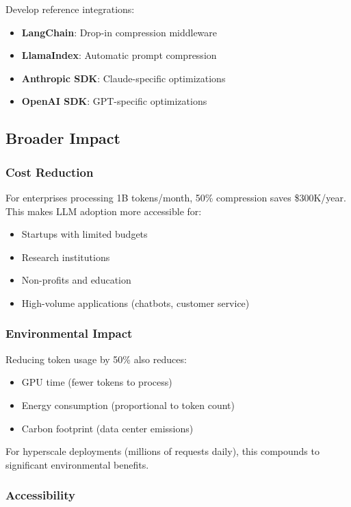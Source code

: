 Develop reference integrations:

\begin{itemize}
    \item \textbf{LangChain}: Drop-in compression middleware
    \item \textbf{LlamaIndex}: Automatic prompt compression
    \item \textbf{Anthropic SDK}: Claude-specific optimizations
    \item \textbf{OpenAI SDK}: GPT-specific optimizations
\end{itemize}

\subsection{Broader Impact}

\subsubsection{Cost Reduction}

For enterprises processing 1B tokens/month, 50\% compression saves \$300K/year. This makes LLM adoption more accessible for:
\begin{itemize}
    \item Startups with limited budgets
    \item Research institutions
    \item Non-profits and education
    \item High-volume applications (chatbots, customer service)
\end{itemize}

\subsubsection{Environmental Impact}

Reducing token usage by 50\% also reduces:
\begin{itemize}
    \item GPU time (fewer tokens to process)
    \item Energy consumption (proportional to token count)
    \item Carbon footprint (data center emissions)
\end{itemize}

For hyperscale deployments (millions of requests daily), this compounds to significant environmental benefits.

\subsubsection{Accessibility}

